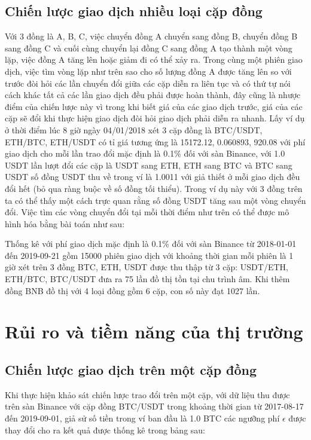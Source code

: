  \subsection{Chiến lược giao dịch nhiều loại cặp đồng}
  Với 3 đồng là A, B, C, việc chuyển đồng A chuyển sang đồng B, chuyển đồng B sang đồng C và cuối cùng chuyển lại đồng C sang đồng A tạo thành một vòng lặp, việc đồng A tăng lên hoặc giảm đi có thể xảy ra. Trong cùng một phiên giao dịch, việc tìm vòng lặp như trên sao cho số lượng đồng A được tăng lên so với trước đòi hỏi các lần chuyển đổi giữa các cặp diễn ra liên tục và có thứ tự nói cách khác tất cả các lần giao dịch đều phải được hoàn thành, đây cũng là nhược điểm của chiến lược này vì trong khi biết giá của các giao dịch trước, giá của các cặp sẽ đổi khi thực hiện giao dịch đòi hỏi giao dịch phải diễn ra nhanh.
  Lấy ví dụ ở thời điểm lúc 8 giờ ngày 04/01/2018 xét 3 cặp đồng là BTC/USDT, ETH/BTC, ETH/USDT có tỉ giá tương ứng là 15172.12, 0.060893, 920.08 với phí giao dịch cho mỗi lần trao đổi mặc định là 0.1\% đối với sàn Binance, với 1.0 USDT lần lượt đổi các cặp là USDT sang ETH, ETH sang BTC và BTC sang USDT số đồng USDT thu về trong ví là 1.0011 với giả thiết ở mỗi giao dịch đều đổi hết (bỏ qua ràng buộc về số đồng tối thiểu). Trong ví dụ này với 3 đồng trên ta có thể thấy một cách trực quan rằng số đồng USDT tăng sau một vòng chuyển đổi. Việc tìm các vòng chuyển đổi tại mỗi thời điểm như trên có thể  được mô hình hóa bằng bài toán như sau:
  
  Thống kê với phí giao dịch mặc định là 0.1\% đối với sàn Binance từ 2018-01-01 đến 2019-09-21 gồm 15000 phiên giao dịch với khoảng thời gian mỗi phiên là 1 giờ xét trên 3 đồng BTC, ETH, USDT được thu thập từ 3 cặp: USDT/ETH, ETH/BTC, BTC/USDT đưa ra 75 lần đồ thị tồn tại chu trình âm. Khi thêm đồng BNB đồ thị với 4 loại đồng gồm 6 cặp, con số này đạt 1027 lần.
  
  \section{Rủi ro và tiềm năng của thị trường}\label{risk-strategy}
\subsection{Chiến lược giao dịch trên một cặp đồng}
  Khi thực hiện khảo sát chiến lược trao đổi trên một cặp, với dữ liệu thu được trên sàn Binance với cặp đồng BTC/USDT trong khoảng thời gian từ 2017-08-17
đến 2019-09-01, giả sử số tiền trong ví ban đầu là 1.0 BTC các ngưỡng phí  $\epsilon$ được thay đổi cho ra kết quả được thống kê trong bảng sau:

